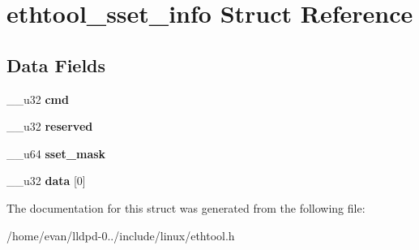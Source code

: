\section{ethtool\-\_\-sset\-\_\-info \-Struct \-Reference}
\label{structethtool__sset__info}
\subsection*{\-Data \-Fields}
\begin{DoxyCompactItemize}
\item 
\-\_\-\-\_\-u32 {\bfseries cmd}\label{structethtool__sset__info_a66d231264d5aa36fd7d347e2c967769a}

\item 
\-\_\-\-\_\-u32 {\bfseries reserved}\label{structethtool__sset__info_a6119e2b7a1d60ee775526a7386af84f2}

\item 
\-\_\-\-\_\-u64 {\bfseries sset\-\_\-mask}\label{structethtool__sset__info_a739ae48ea6b72017e5815dd02dbd502d}

\item 
\-\_\-\-\_\-u32 {\bfseries data} [0]\label{structethtool__sset__info_a010a1dc81a1f229ea789612a1b6db366}

\end{DoxyCompactItemize}


\-The documentation for this struct was generated from the following file\-:\begin{DoxyCompactItemize}
\item 
/home/evan/lldpd-\/0../include/linux/ethtool.\-h\end{DoxyCompactItemize}
